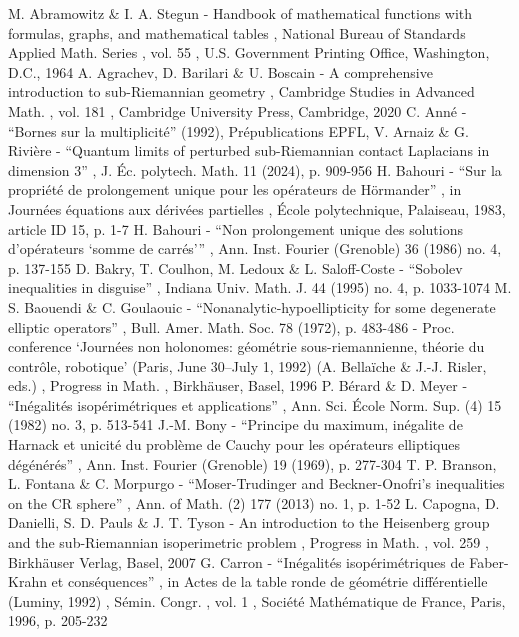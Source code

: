  M. Abramowitz \& I. A. Stegun - Handbook of mathematical functions with formulas, graphs, and mathematical tables , National Bureau of Standards Applied Math. Series , vol. 55 , U.S. Government Printing Office, Washington, D.C., 1964
 A. Agrachev, D. Barilari \& U. Boscain - A comprehensive introduction to sub-Riemannian geometry , Cambridge Studies in Advanced Math. , vol. 181 , Cambridge University Press, Cambridge, 2020
 C. Anné - “Bornes sur la multiplicité” (1992), Prépublications EPFL,
 V. Arnaiz \& G. Rivière - “Quantum limits of perturbed sub-Riemannian contact Laplacians in dimension 3” , J. Éc. polytech. Math. 11 (2024), p. 909-956
 H. Bahouri - “Sur la propriété de prolongement unique pour les opérateurs de Hörmander” , in Journées équations aux dérivées partielles , École polytechnique, Palaiseau, 1983, article ID 15, p. 1-7
 H. Bahouri - “Non prolongement unique des solutions d’opérateurs ‘somme de carrés’” , Ann. Inst. Fourier (Grenoble) 36 (1986) no. 4, p. 137-155
 D. Bakry, T. Coulhon, M. Ledoux \& L. Saloff-Coste - “Sobolev inequalities in disguise” , Indiana Univ. Math. J. 44 (1995) no. 4, p. 1033-1074
 M. S. Baouendi \& C. Goulaouic - “Nonanalytic-hypoellipticity for some degenerate elliptic operators” , Bull. Amer. Math. Soc. 78 (1972), p. 483-486
 - Proc. conference ‘Journées non holonomes: géométrie sous-riemannienne, théorie du contrôle, robotique’ (Paris, June 30–July 1, 1992) (A. Bellaïche \& J.-J. Risler, eds.) , Progress in Math. , Birkhäuser, Basel, 1996
 P. Bérard \& D. Meyer - “Inégalités isopérimétriques et applications” , Ann. Sci. École Norm. Sup. (4) 15 (1982) no. 3, p. 513-541
 J.-M. Bony - “Principe du maximum, inégalite de Harnack et unicité du problème de Cauchy pour les opérateurs elliptiques dégénérés” , Ann. Inst. Fourier (Grenoble) 19 (1969), p. 277-304
 T. P. Branson, L. Fontana \& C. Morpurgo - “Moser-Trudinger and Beckner-Onofri’s inequalities on the CR sphere” , Ann. of Math. (2) 177 (2013) no. 1, p. 1-52
 L. Capogna, D. Danielli, S. D. Pauls \& J. T. Tyson - An introduction to the Heisenberg group and the sub-Riemannian isoperimetric problem , Progress in Math. , vol. 259 , Birkhäuser Verlag, Basel, 2007
 G. Carron - “Inégalités isopérimétriques de Faber-Krahn et conséquences” , in Actes de la table ronde de géométrie différentielle (Luminy, 1992) , Sémin. Congr. , vol. 1 , Société Mathématique de France, Paris, 1996, p. 205-232
